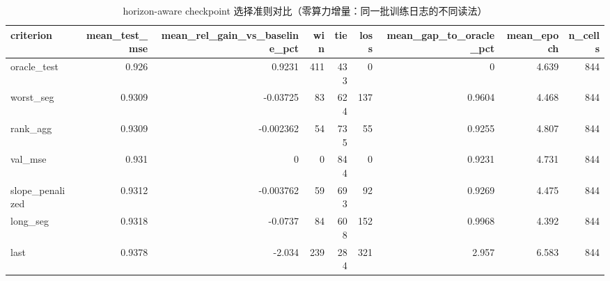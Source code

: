 \begin{table}[htbp]
\centering
\small
\caption{horizon-aware checkpoint 选择准则对比（零算力增量：同一批训练日志的不同读法）}
\label{tab:horizon_criteria}
\begin{tabular}{lrrrrrrrr}
\toprule
criterion & mean\_test\_mse & mean\_rel\_gain\_vs\_baseline\_pct & win & tie & loss & mean\_gap\_to\_oracle\_pct & mean\_epoch & n\_cells \\
\midrule
oracle\_test & 0.926 & 0.9231 & 411 & 433 & 0 & 0 & 4.639 & 844 \\
worst\_seg & 0.9309 & -0.03725 & 83 & 624 & 137 & 0.9604 & 4.468 & 844 \\
rank\_agg & 0.9309 & -0.002362 & 54 & 735 & 55 & 0.9255 & 4.807 & 844 \\
val\_mse & 0.931 & 0 & 0 & 844 & 0 & 0.9231 & 4.731 & 844 \\
slope\_penalized & 0.9312 & -0.003762 & 59 & 693 & 92 & 0.9269 & 4.475 & 844 \\
long\_seg & 0.9318 & -0.0737 & 84 & 608 & 152 & 0.9968 & 4.392 & 844 \\
last & 0.9378 & -2.034 & 239 & 284 & 321 & 2.957 & 6.583 & 844 \\
\bottomrule
\end{tabular}
\end{table}
